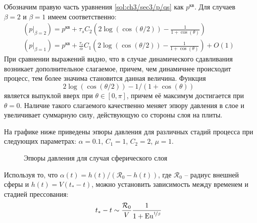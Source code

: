 Обозначим правую часть уравнения \cref{sol:ch3/sec3/p/qs} как $p^\text{кв}$. Для случаев $\beta=2$ и $\beta=1$ имеем соответственно:
\begin{gather}
  \left(p\lvert_{\beta=2}\right) = p^\text{кв} + \tau_{s} C_2 \left(2\log{\left(\cos{\left({\theta / 2}\right)}\right)} - \frac{1}{1+\cos{\left(\theta\right)}}\right)
  \\
  \left(p\lvert_{\beta=1}\right) = p^\text{кв} + \frac{\tau_{s}}{\alpha} C_1 \left(2\log{\left(\cos{\left({\theta / 2}\right)}\right)} - \frac{1}{1+\cos{\left(\theta\right)}}\right) + O(1)
\end{gather}
При сравнении выражений видно, что в случае динамического сдавливания возникает дополнительное слагаемое, причем, чем динамичнее происходит процесс, тем более значима становится данная величина. Функция 
\begin{equation*}
  2\log{\left(\cos{\left({\theta / 2}\right)}\right)} - 1/\left(1+\cos{\left(\theta\right)}\right)
\end{equation*}
является выпуклой вверх при $\theta \in [0, \pi]$, причем её максимум достигается при $\theta=0$.
Наличие такого слагаемого качественно меняет эпюру давления в слое и увеличивает суммарную силу, действующую со стороны слоя на плиты.

На графике ниже приведены эпюры давления для различных стадий процесса при следующих параметрах: $\alpha=0.1$, $C_1=1$, $C_2=2$, $\mu=1$.
\begin{figure}[ht]
    \caption{Эпюры давления для случая сферического слоя}
    \label{fig:ch3/sec3/pressure}
\end{figure}

Используя то, что $\alpha(t) = h(t) / \left(\mathcal{R}_0 - h(t) \right)$, где $\mathcal{R}_0$ -- радиус внешней сферы и $h(t) = V(t_*-t)$, можно установить зависимость между временем и стадией прессования:
\begin{equation}
  t_* - t \sim \frac{\mathcal{R}_0}{V} \frac{1}{1+\text{Eu}^{\nicefrac{1}{\beta}}}
\end{equation}
